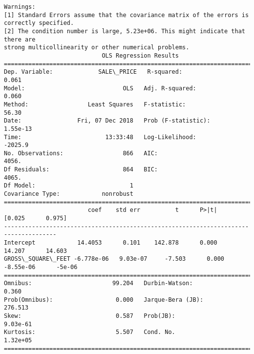 \documentclass[11pt]{article}
\begin{document}
\begin{Verbatim}[commandchars=\\\{\}]
Warnings:
[1] Standard Errors assume that the covariance matrix of the errors is correctly specified.
[2] The condition number is large, 5.23e+06. This might indicate that there are
strong multicollinearity or other numerical problems.
                            OLS Regression Results                            
==============================================================================
Dep. Variable:             SALE\_PRICE   R-squared:                       0.061
Model:                            OLS   Adj. R-squared:                  0.060
Method:                 Least Squares   F-statistic:                     56.30
Date:                Fri, 07 Dec 2018   Prob (F-statistic):           1.55e-13
Time:                        13:33:48   Log-Likelihood:                -2025.9
No. Observations:                 866   AIC:                             4056.
Df Residuals:                     864   BIC:                             4065.
Df Model:                           1                                         
Covariance Type:            nonrobust                                         
=====================================================================================
                        coef    std err          t      P>|t|      [0.025      0.975]
-------------------------------------------------------------------------------------
Intercept            14.4053      0.101    142.878      0.000      14.207      14.603
GROSS\_SQUARE\_FEET -6.778e-06   9.03e-07     -7.503      0.000   -8.55e-06      -5e-06
==============================================================================
Omnibus:                       99.204   Durbin-Watson:                   0.360
Prob(Omnibus):                  0.000   Jarque-Bera (JB):              276.513
Skew:                           0.587   Prob(JB):                     9.03e-61
Kurtosis:                       5.507   Cond. No.                     1.32e+05
==============================================================================


\end{Verbatim}
\end{document}
